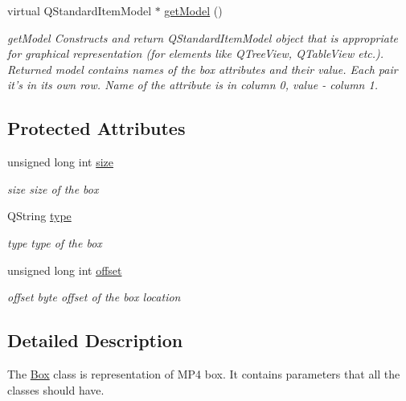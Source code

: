 \begin{DoxyCompactItemize}
virtual Q\-Standard\-Item\-Model $\ast$ \hyperlink{class_box_a5c7911f3c88eec77383c0a464979807d}{get\-Model} ()
\begin{DoxyCompactList}\small\item\em get\-Model Constructs and return Q\-Standard\-Item\-Model object that is appropriate for graphical representation (for elements like Q\-Tree\-View, Q\-Table\-View etc.). Returned model contains names of the box attributes and their value. Each pair it's in its own row. Name of the attribute is in column 0, value -\/ column 1. \end{DoxyCompactList}\end{DoxyCompactItemize}
\subsection*{Protected Attributes}
\begin{DoxyCompactItemize}
\item 
\hypertarget{class_box_a53c2d6400d35f8eed7b8a20d40056385}{unsigned long int \hyperlink{class_box_a53c2d6400d35f8eed7b8a20d40056385}{size}}\label{class_box_a53c2d6400d35f8eed7b8a20d40056385}

\begin{DoxyCompactList}\small\item\em size size of the box \end{DoxyCompactList}\item 
\hypertarget{class_box_a7222d6793ebff6bd17192a5c5740a78b}{Q\-String \hyperlink{class_box_a7222d6793ebff6bd17192a5c5740a78b}{type}}\label{class_box_a7222d6793ebff6bd17192a5c5740a78b}

\begin{DoxyCompactList}\small\item\em type type of the box \end{DoxyCompactList}\item 
\hypertarget{class_box_a02478afe7796308689a7929a5d17cd3d}{unsigned long int \hyperlink{class_box_a02478afe7796308689a7929a5d17cd3d}{offset}}\label{class_box_a02478afe7796308689a7929a5d17cd3d}

\begin{DoxyCompactList}\small\item\em offset byte offset of the box location \end{DoxyCompactList}\end{DoxyCompactItemize}


\subsection{Detailed Description}
The \hyperlink{class_box}{Box} class is representation of M\-P4 box. It contains parameters that all the classes should have. 

